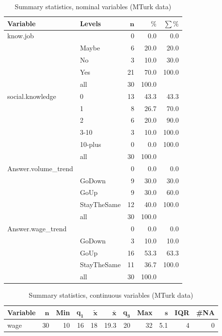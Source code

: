 \documentclass[a4paper,10pt]{article}\usepackage[]{graphicx}\usepackage[]{color}
\begin{document}
\begin{table}[ht]
\centering
{\footnotesize
\begin{tabular}{ll|rrr}
 \textbf{Variable} & \textbf{Levels} & $\mathbf{n}$ & $\mathbf{\%}$ & $\mathbf{\sum \%}$ \\ 
  \hline
know.job &  & 0 & 0.0 & 0.0 \\ 
   & Maybe & 6 & 20.0 & 20.0 \\ 
   & No & 3 & 10.0 & 30.0 \\ 
   & Yes & 21 & 70.0 & 100.0 \\ 
   \hline
 & all & 30 & 100.0 &  \\ 
   \hline
\hline
social.knowledge & 0 & 13 & 43.3 & 43.3 \\ 
   & 1 & 8 & 26.7 & 70.0 \\ 
   & 2 & 6 & 20.0 & 90.0 \\ 
   & 3-10 & 3 & 10.0 & 100.0 \\ 
   & 10-plus & 0 & 0.0 & 100.0 \\ 
   \hline
 & all & 30 & 100.0 &  \\ 
   \hline
\hline
Answer.volume\_trend &  & 0 & 0.0 & 0.0 \\ 
   & GoDown & 9 & 30.0 & 30.0 \\ 
   & GoUp & 9 & 30.0 & 60.0 \\ 
   & StayTheSame & 12 & 40.0 & 100.0 \\ 
   \hline
 & all & 30 & 100.0 &  \\ 
   \hline
\hline
Answer.wage\_trend &  & 0 & 0.0 & 0.0 \\ 
   & GoDown & 3 & 10.0 & 10.0 \\ 
   & GoUp & 16 & 53.3 & 63.3 \\ 
   & StayTheSame & 11 & 36.7 & 100.0 \\ 
   \hline
 & all & 30 & 100.0 &  \\ 
   \hline
\hline
\end{tabular}
}
\caption{Summary statistics, nominal variables (MTurk data)} 
\label{tab1:51-4040}
\end{table}
\begin{table}[ht]
\centering
{\footnotesize
\begin{tabular}{lrrrrrrrrrr}
 \textbf{Variable} & $\mathbf{n}$ & \textbf{Min} & $\mathbf{q_1}$ & $\mathbf{\widetilde{x}}$ & $\mathbf{\bar{x}}$ & $\mathbf{q_3}$ & \textbf{Max} & $\mathbf{s}$ & \textbf{IQR} & \textbf{\#NA} \\ 
  \hline
wage & 30 & 10 & 16 & 18 & 19.3 & 20 & 32 & 5.1 & 4 & 0 \\ 
  \end{tabular}
}
\caption{Summary statistics, continuous variables (MTurk data)} 
\label{tab2:51-4040}
\end{table}
\end{document}
